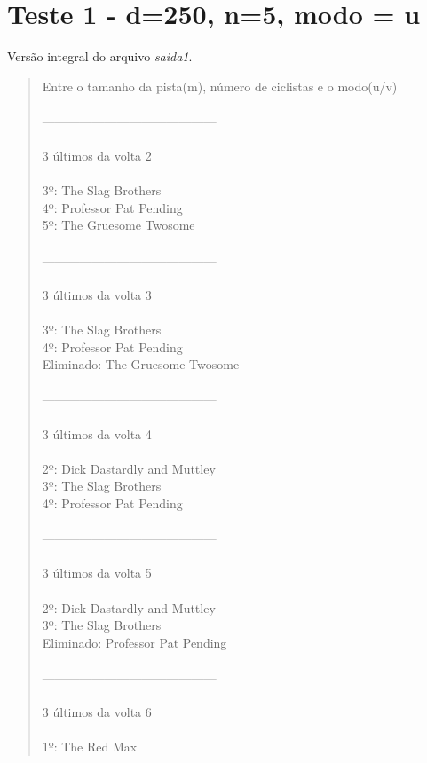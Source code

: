 \documentclass[paper=a4, fontsize=11pt]{scrartcl}
\numberwithin{equation}{section}		%
\numberwithin{figure}{section}			%
\numberwithin{table}{section}				%
\begin{document}
\section{Teste 1 - d=250, n=5, modo = u}
Versão integral do arquivo \textit{saida1}.
\begin{quote}
Entre o tamanho da pista(m), número de ciclistas e o modo(u/v)
\\
\\------------------------------------------
\\
\\3 últimos da volta 2
\\
\\3º: The Slag Brothers
\\4º: Professor Pat Pending
\\5º: The Gruesome Twosome
\\
\\------------------------------------------
\\
\\3 últimos da volta 3
\\
\\3º: The Slag Brothers
\\4º: Professor Pat Pending
\\Eliminado: The Gruesome Twosome
\\
\\------------------------------------------
\\
\\3 últimos da volta 4
\\
\\2º: Dick Dastardly and Muttley
\\3º: The Slag Brothers
\\4º: Professor Pat Pending
\\
\\------------------------------------------
\\
\\3 últimos da volta 5
\\
\\2º: Dick Dastardly and Muttley
\\3º: The Slag Brothers
\\Eliminado: Professor Pat Pending
\\
\\------------------------------------------
\\
\\3 últimos da volta 6
\\
\\1º: The Red Max

\end{quote}
\end{document}
